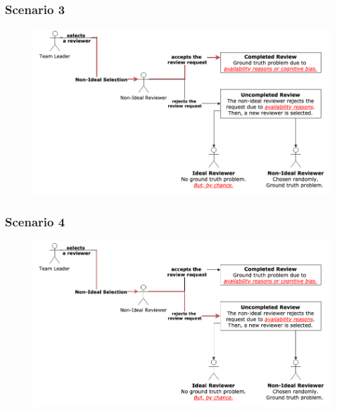 \documentclass{beamer}
\begin{document}
\begin{frame}
\frametitle{\large Scenario 3}
      \begin{figure}
      \includegraphics[width=1.05\textwidth]{img/scenarios_3.png}
      \end{figure}
\end{frame}
\begin{frame}
\frametitle{\large Scenario 4}
      \begin{figure}
      \includegraphics[width=1.05\textwidth]{img/scenarios_4.png}
      \end{figure}
\end{frame}
\end{document}
